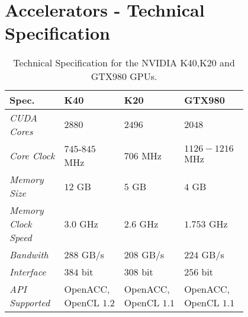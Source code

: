 \chapter{Accelerators - Technical Specification}
\label{app:tech_spec}
\begin{table}[H]
	\centering
	\caption{Technical Specification for the NVIDIA K40,K20 and GTX980 GPUs.}
	\label{tab:tech_spec_nvidia}
\begin{tabular}{m{0.2\linewidth} m{0.2\linewidth} m{0.2\linewidth} m{0.2\linewidth}}
	\toprule
	{\textbf{Spec.}} & {\textbf{K40}} & {\textbf{K20}} & {\textbf{GTX980}}\\
	\midrule
	\textit{CUDA Cores}                & $2880$   & $2496$    & $2048$   \\
	
	\textit{Core Clock}                & $745$-$845$ \si{MHz}   & $706$ \si{MHz}    &    $1126-1216$ \si{MHz} \\

	
\midrule
	
	\textit{Memory Size}                & $12$ \si{GB}  & $5$ \si{GB}    & $4$ \si{GB}    \\
	
	\textit{Memory Clock Speed}                & $3.0$ \si{GHz}   & $2.6$ \si{GHz}    &  $1.753$ \si{GHz}    \\
	
	\textit{Bandwith}                & $288$ \si{GB/s}   & $208$ \si{GB/s}   & $224$ \si{GB/s}   \\

	\textit{Interface}                & $384$ bit   & $308$ \si{bit}    & $256$ \si{bit}    \\

	\midrule
	\textit{API Supported}                & OpenACC, OpenCL $1.2$   &  OpenACC, OpenCL $1.1$    & OpenACC, OpenCL $1.1$    \\
	\bottomrule
\end{tabular}
\end{table}
